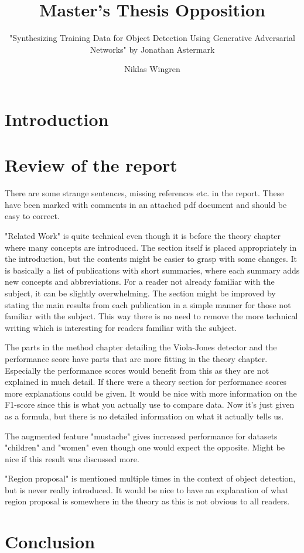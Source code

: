 \documentclass[10pt,a4paper]{scrartcl}
\author{Niklas Wingren}
\title{Master's Thesis Opposition}
\subtitle{"Synthesizing Training Data for Object Detection Using Generative Adversarial Networks" by Jonathan Astermark}
\begin{document}
	\maketitle
	
	\section*{Introduction}
	
	\section*{Review of the report}
	There are some strange sentences, missing references etc. in the report. These have been marked with comments in an attached pdf document and should be easy to correct.
	
	"Related Work" is quite technical even though it is before the theory chapter where many concepts are introduced. The section itself is placed appropriately in the introduction, but the contents might be easier to grasp with some changes. It is basically a list of publications with short summaries, where each summary adds new concepts and abbreviations. For a reader not already familiar with the subject, it can be slightly overwhelming. The section might be improved by stating the main results from each publication in a simple manner for those not familiar with the subject. This way there is no need to remove the more technical writing which is interesting for readers familiar with the subject.
	
	The parts in the method chapter detailing the Viola-Jones detector and the performance score have parts that are more fitting in the theory chapter. Especially the performance scores would benefit from this as they are not explained in much detail. If there were a theory section for performance scores more explanations could be given. It would be nice with more information on the F1-score since this is what you actually use to compare data. Now it’s just given as a formula, but there is no detailed information on what it actually tells us.
	
	The augmented feature "mustache" gives increased performance for datasets "children" and "women" even though one would expect the opposite. Might be nice if this result was discussed more.
	
	"Region proposal" is mentioned multiple times in the context of object detection, but is never really introduced. It would be nice to have an explanation of what region proposal is somewhere in the theory as this is not obvious to all readers.
	
	\section*{Conclusion}	
	
\end{document}
